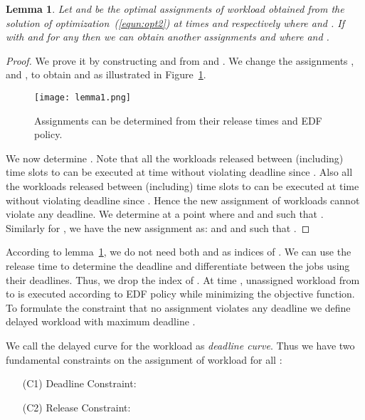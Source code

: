 \documentclass[10pt,conference,compsocconf,letterpaper]{IEEEtran}
\newtheorem{lemma}{\bf Lemma}
\begin{document}
\begin{lemma}
\label{lemma:edf}  Let  and  be the optimal assignments of workload obtained from the solution of optimization~(\ref{equn:opt2}) at times  and  respectively where  and . If  with  and  for any  then we can obtain another assignments  and  where  and .
\end{lemma}

\begin{proof}
We prove it by constructing  and  from  and . We change the assignments ,  and ,  to obtain  and  as illustrated in Figure~\ref{fig:lemma1}.
\begin{figure}[!ht]
\begin{center}
\texttt{[image: lemma1.png]}
\caption{Assignments can be determined from their release times and EDF policy.}
\label{fig:lemma1}
\end{center}
\end{figure}
We now determine . Note that all the workloads released between (including) time slots  to  can be executed at time  without violating deadline since . Also all the workloads released between (including) time slots  to  can be executed at time  without violating deadline since . Hence the new assignment of workloads cannot violate any deadline. We determine  at a point where  and  and  such that . Similarly for , we have the new assignment as:  
  and   and  such that .
\end{proof}





According to lemma~\ref{lemma:edf}, we do not need both  and  as indices of . We can use the release time  to determine the deadline  and differentiate between the jobs using their deadlines. Thus, we drop the index  of . At time , unassigned workload from  to  is executed according to EDF policy while minimizing the objective function. To formulate the constraint that no assignment violates any deadline we define delayed workload  with maximum deadline .

We call the delayed curve  for the workload as {\it deadline curve}. Thus we have two fundamental constraints on the assignment of workload for all :

\begin{enumerate}
\item[(C1)] Deadline Constraint: 
\item[(C2)] Release Constraint: 
\end{enumerate}
\end{document}
